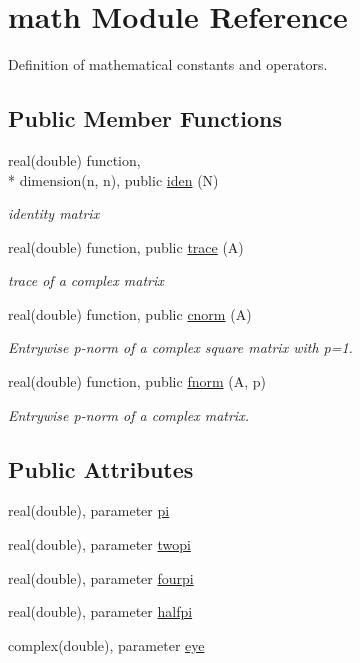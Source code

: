 \hypertarget{classmath}{\section{math Module Reference}
\label{classmath}
}


Definition of mathematical constants and operators.  


\subsection*{Public Member Functions}
\begin{DoxyCompactItemize}
\item 
real(double) function, \\*
dimension(n, n), public \hyperlink{classmath_a43efec08acf55747fa1e14085858aade}{iden} (N)
\begin{DoxyCompactList}\small\item\em identity matrix \end{DoxyCompactList}\item 
real(double) function, public \hyperlink{classmath_a9f8f22c01066f03fe5900edb63b56c89}{trace} (A)
\begin{DoxyCompactList}\small\item\em trace of a complex matrix \end{DoxyCompactList}\item 
real(double) function, public \hyperlink{classmath_a864984937cf0f3b7bdbc9b652b84445d}{cnorm} (A)
\begin{DoxyCompactList}\small\item\em Entrywise p-\/norm of a complex square matrix with p=1. \end{DoxyCompactList}\item 
real(double) function, public \hyperlink{classmath_a2830cb5393b6e6a8baa8d072c73ce8a9}{fnorm} (A, p)
\begin{DoxyCompactList}\small\item\em Entrywise p-\/norm of a complex matrix. \end{DoxyCompactList}\end{DoxyCompactItemize}
\subsection*{Public Attributes}
\begin{DoxyCompactItemize}
\item 
real(double), parameter \hyperlink{classmath_aa2f838077707f6cdb0c8a0ec69719690}{pi}
\item 
real(double), parameter \hyperlink{classmath_aeb6d7ed6a20444e26f024b34eaa4c4f7}{twopi}
\item 
real(double), parameter \hyperlink{classmath_a83cddb754967ada1a15217d10ed9c24b}{fourpi}
\item 
real(double), parameter \hyperlink{classmath_a99d72d3bce2cadc8630d10ee09aaa3ea}{halfpi}
\item 
complex(double), parameter \hyperlink{classmath_ae0354610846d49064ea0336f19d5bf3f}{eye}
\end{DoxyCompactItemize}


